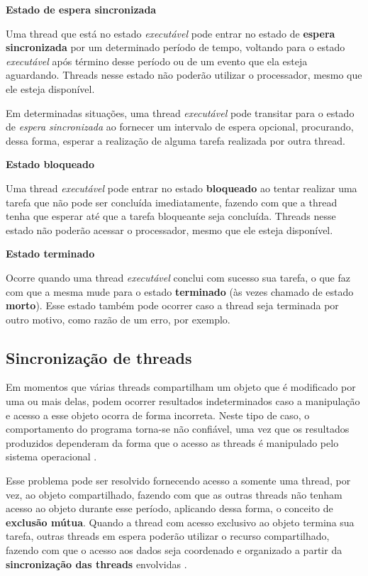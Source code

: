 \textbf{Estado de espera sincronizada}

Uma thread que está no estado \textit{executável} pode entrar no estado de \textbf{espera sincronizada} por um determinado período de tempo, voltando para o estado \textit{executável} após término desse período ou de um evento que ela esteja aguardando. Threads nesse estado não poderão utilizar o processador, mesmo que ele esteja disponível.

Em determinadas situações, uma thread \textit{executável} pode transitar para o estado de \textit{espera sincronizada} ao fornecer um intervalo de espera opcional, procurando, dessa forma, esperar a realização de alguma tarefa realizada por outra thread.

\textbf{Estado bloqueado}

Uma thread \textit{executável} pode entrar no estado \textbf{bloqueado} ao tentar realizar uma tarefa que não pode ser concluída imediatamente, fazendo com que a thread tenha que esperar até que a tarefa bloqueante seja concluída. Threads nesse estado não poderão acessar o processador, mesmo que ele esteja disponível.

\textbf{Estado terminado}

Ocorre quando uma thread \textit{executável} conclui com sucesso sua tarefa, o que faz com que a mesma mude para o estado \textbf{terminado} (às vezes chamado de estado \textbf{morto}). Esse estado também pode ocorrer caso a thread seja terminada por outro motivo, como razão de um erro, por exemplo. 

\subsection{Sincronização de threads}

Em momentos que várias threads compartilham um objeto que é modificado por uma ou mais delas, podem ocorrer resultados indeterminados caso a manipulação e acesso a esse objeto ocorra de forma incorreta. Neste tipo de caso, o comportamento do programa torna-se não confiável, uma vez que os resultados produzidos dependeram da forma que o acesso as threads é manipulado pelo sistema operacional \cite{deitel2016}. 

Esse problema pode ser resolvido fornecendo acesso a somente uma thread, por vez, ao objeto compartilhado, fazendo com que as outras threads não tenham acesso ao objeto durante esse período, aplicando dessa forma, o conceito de \textbf{exclusão mútua}. Quando a thread com acesso exclusivo ao objeto termina sua tarefa, outras threads em espera poderão utilizar o recurso compartilhado, fazendo com que o acesso aos dados seja coordenado e organizado a partir da \textbf{sincronização das threads} envolvidas \cite{tanenbaum2015modern}.

